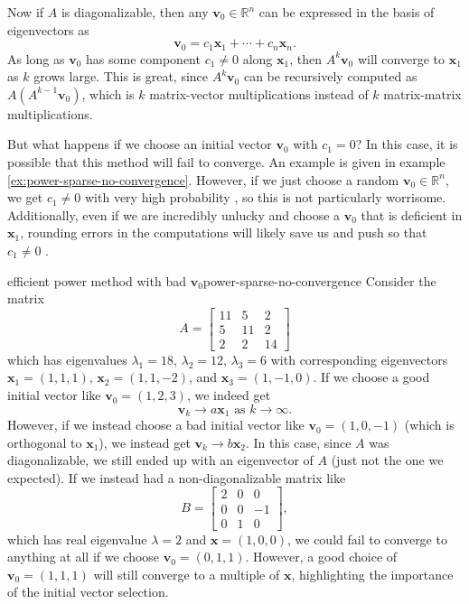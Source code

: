 \documentclass{article}
\let\vec\mathbf
\begin{document}
Now if $A$ is diagonalizable, then any $\vec{v}_0 \in \mathbb{R}^n$ can be expressed in the basis of eigenvectors as
\begin{equation*}
  \vec{v}_0 = c_1\vec{x}_1 + \cdots + c_n\vec{x}_n.
\end{equation*}
As long as $\vec{v}_0$ has some component $c_1 \neq 0$ along $\vec{x}_1$, then $A^k\vec{v}_0$ will converge to $\vec{x}_1$ as $k$ grows large. This is great, since $A^k\vec{v}_0$ can be recursively computed as $A(A^{k-1}\vec{v}_0)$, which is $k$ matrix-vector multiplications instead of $k$ matrix-matrix multiplications.

But what happens if we choose an initial vector $\vec{v}_0$ with $c_1 = 0$? In this case, it is possible that this method will fail to converge. An example is given in example \ref{ex:power-sparse-no-convergence}. However, if we just choose a random $\vec{v}_0 \in \mathbb{R}^n$, we get $c_1 \neq 0$ with very high probability \cite[p.~53]{cornell}, so this is not particularly worrisome. Additionally, even if we are incredibly unlucky and choose a $\vec{v}_0$ that is deficient in $\vec{x}_1$, rounding errors in the computations will likely save us and push so that $c_1 \neq 0$ \cite{pwr-rot}.

\begin{example}{efficient power method with bad $\vec{v}_0$}{power-sparse-no-convergence}
  Consider the matrix
  \begin{equation*}
    A = \begin{bmatrix}11 & 5 & 2 \\ 5 & 11 & 2 \\ 2 & 2 & 14\end{bmatrix}
  \end{equation*}
  which has eigenvalues $\lambda_1 = 18$, $\lambda_2 = 12$, $\lambda_3 = 6$ with corresponding eigenvectors $\vec{x}_1 = (1,1,1)$, $\vec{x}_2 = (1,1,-2)$, and $\vec{x}_3 = (1,-1,0)$. If we choose a good initial vector like $\vec{v}_0 = (1,2,3)$, we indeed get
  \begin{equation*}
    \vec{v}_k \to a\vec{x}_1 \textrm{  as  } k \to \infty.
  \end{equation*}
  However, if we instead choose a bad initial vector like $\vec{v}_0 = (1,0,-1)$ (which is orthogonal to $\vec{x}_1$), we instead get $\vec{v}_k \to b\vec{x}_2$. In this case, since $A$ was diagonalizable, we still ended up with an eigenvector of $A$ (just not the one we expected). If we instead had a non-diagonalizable matrix like
  \begin{equation*}
    B = \begin{bmatrix}2 & 0 & 0 \\ 0 & 0 & -1 \\ 0 & 1 & 0\end{bmatrix},
  \end{equation*}
  which has real eigenvalue $\lambda=2$ and $\vec{x} = (1,0,0)$, we could fail to converge to anything at all if we choose $\vec{v}_0 = (0,1,1)$. However, a good choice of $\vec{v}_0 = (1,1,1)$ will still converge to a multiple of $\vec{x}$, highlighting the importance of the initial vector selection.
\end{example}
\end{document}
